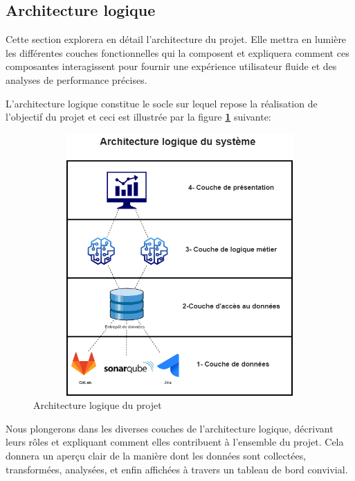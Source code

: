 \subsection{Architecture logique} 
\par Cette section explorera en détail l'architecture du projet. Elle mettra en lumière les différentes couches fonctionnelles qui la composent et expliquera comment ces composantes interagissent pour fournir une expérience utilisateur fluide et des analyses de performance précises. 
\par L'architecture logique constitue le socle sur lequel repose la réalisation de l'objectif du projet et ceci est illustrée par la figure \textbf{\ref{fig:arch_log}} suivante:
        \begin{figure}[H]
        \centering
        \includegraphics[width = 12cm , height=10cm]{img/techno/archi_log.png}
        \caption{Architecture logique du projet}
        \label{fig:arch_log}
        \end{figure}
    \par Nous plongerons dans les diverses couches de l'architecture logique, décrivant leurs rôles et expliquant comment elles contribuent à l'ensemble du projet. Cela donnera un aperçu clair de la manière dont les données sont collectées, transformées, analysées, et enfin affichées à travers un tableau de bord convivial.
